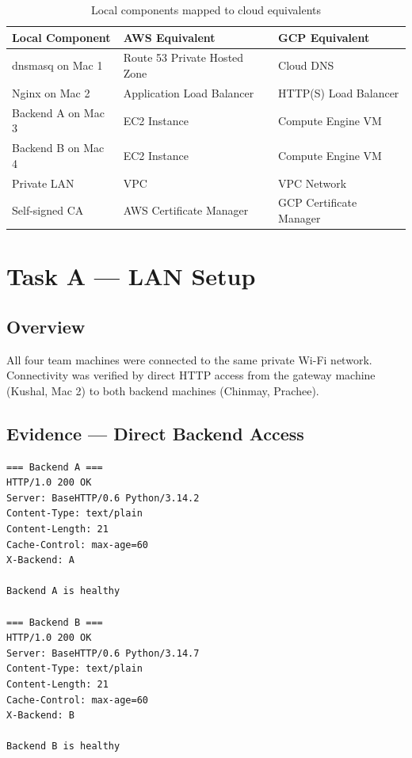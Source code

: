 \documentclass[12pt,a4paper]{article}
\begin{document}
\begin{table}[h!]
\centering
\caption{Local components mapped to cloud equivalents}
\begin{tabular}{lll}
\toprule
\textbf{Local Component} & \textbf{AWS Equivalent} & \textbf{GCP Equivalent} \\
\midrule
dnsmasq on Mac 1 & Route 53 Private Hosted Zone & Cloud DNS \\
Nginx on Mac 2 & Application Load Balancer & HTTP(S) Load Balancer \\
Backend A on Mac 3 & EC2 Instance & Compute Engine VM \\
Backend B on Mac 4 & EC2 Instance & Compute Engine VM \\
Private LAN & VPC & VPC Network \\
Self-signed CA & AWS Certificate Manager & GCP Certificate Manager \\
\bottomrule
\end{tabular}
\end{table}

\section{Task A --- LAN Setup}

\subsection{Overview}

All four team machines were connected to the same private Wi-Fi network. Connectivity was verified by direct HTTP access from the gateway machine (Kushal, Mac 2) to both backend machines (Chinmay, Prachee).

\subsection{Evidence --- Direct Backend Access}

\begin{lstlisting}
=== Backend A ===
HTTP/1.0 200 OK
Server: BaseHTTP/0.6 Python/3.14.2
Content-Type: text/plain
Content-Length: 21
Cache-Control: max-age=60
X-Backend: A

Backend A is healthy

=== Backend B ===
HTTP/1.0 200 OK
Server: BaseHTTP/0.6 Python/3.14.7
Content-Type: text/plain
Content-Length: 21
Cache-Control: max-age=60
X-Backend: B

Backend B is healthy
\end{lstlisting}
\end{document}
